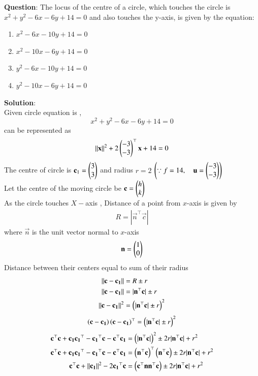 \documentclass[journal]{IEEEtran}
\begin{document}
\textbf{Question}:
The locus of the centre of a circle, which touches the circle is $x^2 + y^2 -6x -6y +14 =0$ and also touches the y-axis, is given by the equation:
\begin{enumerate}
    \item $x^2-6x-10y+14=0$
    \item $x^2-10x-6y+14=0$
    \item $y^2-6x-10y+14=0$
    \item $y^2-10x-6y+14=0$
\end{enumerate}
\textbf{Solution}:\\
Given circle equation is ,
$$x^2 + y^2 -6x -6y +14 =0$$
can be represented as 
\begin{align}
    \left\lVert\mathbf{x}\right\rVert^2+2\begin{pmatrix}-3\\-3\end{pmatrix}^\top\mathbf{x}+14=0
\end{align}
The centre of circle is $\mathbf{c}_1=\begin{pmatrix}3\\3\end{pmatrix}$ and radius $r=2$ $\left(\because f= 14 ,\quad \mathbf{u}=\begin{pmatrix}-3\\-3\end{pmatrix}\right) $\\
Let the centre of the moving circle be $\mathbf{c}=\begin{pmatrix}h\\k\end{pmatrix}$\\
As the circle touches $X-$axis , Distance of a point from $x$-axis is given by
\begin{align}
    R=|\vec{n}^\top\vec{c}|
\end{align}
where $\vec{n}$ is the unit vector normal to $x$-axis\\
\begin{align}
 \mathbf{n}=\begin{pmatrix}1\\0\end{pmatrix}
\end{align}
Distance between their centers equal to sum of their radius
\begin{align}
    \left\lVert\mathbf{c}-\mathbf{c_1}\right\rVert&=R \pm r\\
\left\lVert\mathbf{c}-\mathbf{c_1}\right\rVert&=|\mathbf{n}^\top\mathbf{c}| \pm r \\
\left\lVert\mathbf{c}-\mathbf{c_1}\right\rVert^2&=\left(|\mathbf{n}^\top\mathbf{c}| \pm r\right)^2 
\end{align}
\begin{align}
\left(\mathbf{c}-\mathbf{c_1}\right)\left(\mathbf{c}-\mathbf{c_1}\right)^\top=\left(|\mathbf{n}^\top\mathbf{c}| \pm r\right)^2 
\end{align}
\begin{align}
\mathbf{c}^\top\mathbf{c}+\mathbf{c_1}\mathbf{c_1}^\top-\mathbf{c_1}^\top\mathbf{c}-\mathbf{c}^\top\mathbf{c_1}&= \left(|\mathbf{n}^\top\mathbf{c}|\right)^2 \pm 2r|\mathbf{n}^\top\mathbf{c}|+r^2\\
\mathbf{c}^\top\mathbf{c}+\mathbf{c_1}\mathbf{c_1}^\top-\mathbf{c_1}^\top\mathbf{c}-\mathbf{c}^\top\mathbf{c_1}&= \left(\mathbf{n}^\top\mathbf{c}\right)^\top\left(\mathbf{n}^\top\mathbf{c}\right)  \pm 2r|\mathbf{n}^\top\mathbf{c}|+r^2\\
\mathbf{c}^\top\mathbf{c}+\left\lVert\mathbf{c_1}\right\rVert^2-2\mathbf{c_1}^\top\mathbf{c}&=\left(\mathbf{c}^\top\mathbf{n}\mathbf{n}^\top\mathbf{c}\right) \pm 2r|\mathbf{n}^\top\mathbf{c}|+r^2
\end{align}
\end{document}
